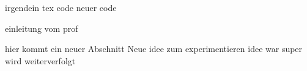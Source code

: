 irgendein tex code
neuer code

einleitung vom prof

hier kommt ein neuer Abschnitt
Neue idee zum experimentieren
idee war super wird weiterverfolgt
